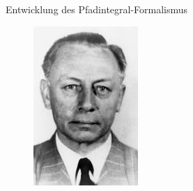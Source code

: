 \begin{frame}{Entwicklung des Pfadintegral-Formalismus}

\begin{figure}[H]
	\begin{minipage}{0.275\textwidth}
	\includegraphics[width = \textwidth]{figures/wentzel}	
	\end{minipage}
	\begin{minipage}{0.315\textwidth}

\end{minipage}
\end{figure}
\end{frame}
